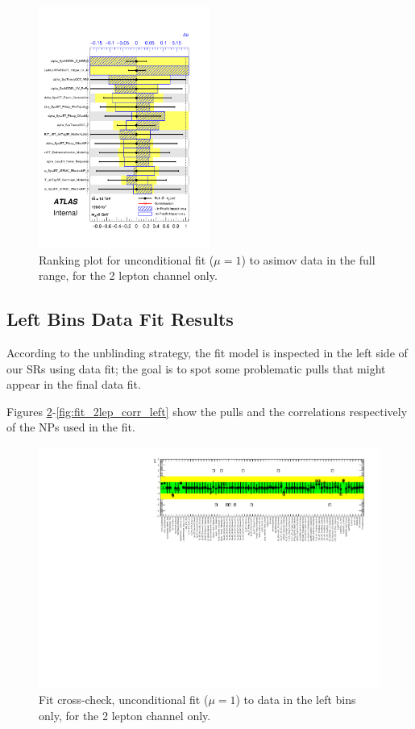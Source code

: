 \begin{figure}[ht]
      \centering
        \includegraphics[width=0.5\textwidth]{figures/2lep/FitResults/pulls_mu_SemileptonicVBS_5_AsimovAllbins.pdf}
        \caption{Ranking plot for unconditional fit ($\mu=1$) to asimov data in the full range, for the 2 lepton channel only.}
       \label{fig:fit_2lep_ranking_all}
\end{figure}

\subsection{Left Bins Data Fit Results}

According to the unblinding strategy, the fit model is inspected in the left side of our SRs using data fit;
the goal is to spot some problematic pulls that might appear in the final data fit.

Figures \ref{fig:fit_2lep_fcc_left}-\ref{fig:fit_2lep_corr_left}
show the pulls and the correlations respectively of the NPs used in the fit.

\begin{figure}[ht]
      \centering
        \includegraphics[width=\linewidth]{figures/2lep/FitResults/NP_allExceptGammas_DataLeftBins.pdf}
        \caption{Fit cross-check, unconditional fit ($\mu=1$) to data in the left bins only, for the 2 lepton channel only.}
       \label{fig:fit_2lep_fcc_left}
\end{figure}

